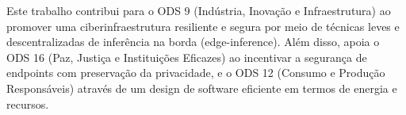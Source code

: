 
%

%

Este trabalho contribui para o ODS 9 (Indústria, Inovação e Infraestrutura) ao promover uma ciberinfraestrutura resiliente e segura por meio de técnicas leves e descentralizadas de inferência na borda (edge-inference). Além disso, apoia o ODS 16 (Paz, Justiça e Instituições Eficazes) ao incentivar a segurança de endpoints com preservação da privacidade, e o ODS 12 (Consumo e Produção Responsáveis) através de um design de software eficiente em termos de energia e recursos.
